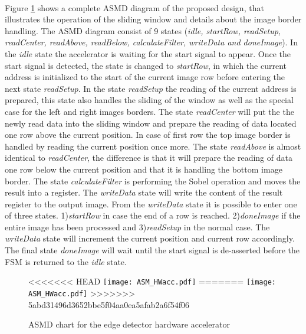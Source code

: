 \paragraph*{}
Figure \ref{fig:ASM_HW} shows a complete ASMD diagram of the proposed design, that illustrates the operation of the sliding window and details about the image border handling. The ASMD diagram consist of 9 states (\emph{idle, startRow, readSetup, readCenter, readAbove, readBelow, calculateFilter, writeData and doneImage}).
In the \emph{idle} state the accelerator is waiting for the start signal to appear. Once the start signal is detected, the state is changed to \emph{startRow}, in which the current address is initialized to the start of the current image row before entering the next state \emph{readSetup}. In the state \emph{readSetup} the reading of the current address is prepared, this state also handles the sliding of the window as well as the special case for the left and right images borders. The state \emph{readCenter} will put the the newly read data into the sliding window and prepare the reading of data located one row above the current position. In case of first row the top image border is handled by reading the current position once more. The state \emph{readAbove} is almost identical to \emph{readCenter}, the difference is that it will prepare the reading of data one row below the current position and that it is handling the bottom image border. The state \emph{calculateFilter} is performing the Sobel operation and moves the result into a register. The \emph{writeData} state will write the content of the result register to the output image. From the \emph{writeData} state it is possible to enter one of three states. 1)\emph{startRow} in case the end of a row is reached. 2)\emph{doneImage} if the entire image has been processed and 3)\emph{readSetup} in the normal case.
The \emph{writeData} state will increment the current position and current row accordingly. The final state \emph{doneImage} will wait until the start signal is de-asserted before the FSM is returned to the \emph{idle} state.


\begin{figure}[H]
	\centering
<<<<<<< HEAD
	\texttt{[image: ASM\_HWacc.pdf]}
=======
	\texttt{[image: ASM\_HWacc.pdf]}
>>>>>>> 5abd31496d3652bbe5f04aa0ea5afab2a6f54f06
	\caption{ASMD chart for the edge detector hardware accelerator}
	\label{fig:ASM_HW}
\end{figure}



